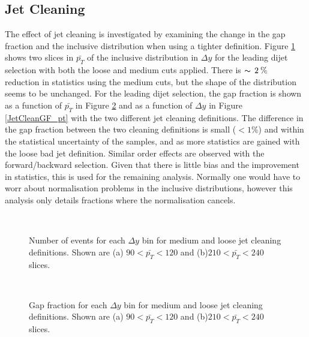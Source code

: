 \subsection{Jet Cleaning}
\label{sec:GBJ1:Cleaning}

The effect of jet cleaning is investigated by examining the change in the gap fraction and the inclusive distribution when using a tighter definition. 
Figure \ref{JetCleanIncl_dy} shows two slices in $\bar{p_T}$ of the inclusive distribution in $\Delta y$ for the leading \pt{} dijet selection with both the loose and medium cuts applied. 
There is $\thicksim\, 2\: \%\: $ reduction in statistics using the medium cuts, but the shape of the distribution seems to be unchanged.  
For the leading \pt{} dijet selection, the gap fraction is shown as a function of $\bar{p_T}$ in Figure \ref{JetCleanGF_dy} and as a function of $\Delta y$ in Figure \ref{JetCleanGF_pt} with the two different jet cleaning definitions. 
The difference in the gap fraction between the two cleaning definitions is small ($<1\%$) and within the statistical uncertainty of the samples, and as more statistics are gained with the loose bad jet definition.
Similar order effects are observed with the forward/backward selection.
Given that there is little bias and the improvement in statistics, this is used for the remaining analysis. 
Normally one would have to worr about normalisation problems in the inclusive distributions, however this analysis only details fractions where the normalisation cancels.


\begin{figure}
\centering
\mbox{
              \quad
              \quad
                              }
\caption[Effect of jet cleaning on the inclusive distribution for $\bar{p_T}$]{Number of events for each $\Delta y$ bin for medium and loose jet cleaning definitions. Shown are (a) $90<\bar{p_T}<120$ and (b)$210<\bar{p_T}<240$ slices.\label{JetCleanIncl_dy}}
\end{figure}

\begin{figure}
\centering
\mbox{
              \quad
              \quad
                              }
\caption[Effect of jet cleaning on the gap fraction for $\bar{p_T}$]{Gap fraction for each $\Delta y$ bin for medium and loose jet cleaning definitions. Shown are (a) $90<\bar{p_T}<120$ and (b)$210<\bar{p_T}<240$ slices.\label{JetCleanGF_dy}}
\end{figure}


